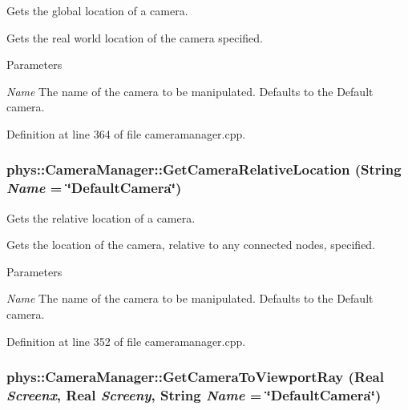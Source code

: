 Gets the global location of a camera. 

Gets the real world location of the camera specified. 
\begin{DoxyParams}{Parameters}
\item[{\em Name}]The name of the camera to be manipulated. Defaults to the Default camera. \end{DoxyParams}


Definition at line 364 of file cameramanager.cpp.

\hypertarget{classphys_1_1CameraManager_a8557218460fbc94a029f74945fa2517c}{
\subsubsection[{GetCameraRelativeLocation}]{ phys::CameraManager::GetCameraRelativeLocation ({\bf String} {\em Name} = {\ttfamily \char`\"{}DefaultCamera\char`\"{}})}}
\label{d9/d91/classphys_1_1CameraManager_a8557218460fbc94a029f74945fa2517c}


Gets the relative location of a camera. 

Gets the location of the camera, relative to any connected nodes, specified. 
\begin{DoxyParams}{Parameters}
\item[{\em Name}]The name of the camera to be manipulated. Defaults to the Default camera. \end{DoxyParams}


Definition at line 352 of file cameramanager.cpp.

\hypertarget{classphys_1_1CameraManager_a1a631eee22a0e45e2e72727d0bcc3560}{
\subsubsection[{GetCameraToViewportRay}]{ phys::CameraManager::GetCameraToViewportRay ({\bf Real} {\em Screenx}, \/  {\bf Real} {\em Screeny}, \/  {\bf String} {\em Name} = {\ttfamily \char`\"{}DefaultCamera\char`\"{}})}}
\label{d9/d91/classphys_1_1CameraManager_a1a631eee22a0e45e2e72727d0bcc3560}


